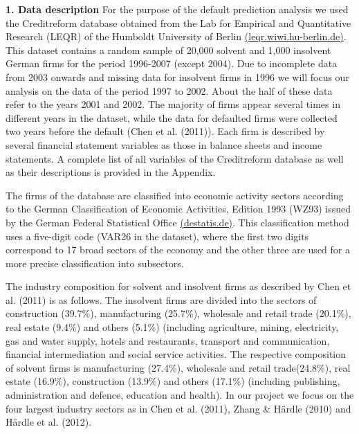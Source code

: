 \documentclass[11pt]{article}
\begin{document}
\textbf{1. Data description}
\vskip 0.2in
For the purpose of the default prediction analysis we used  the Creditreform database obtained from the Lab for Empirical and Quantitative Research (LEQR) of the Humboldt University of Berlin \href{<https://leqr.wiwi.hu-berlin.de/leqr/content/databaseInformation/creditreform/creditreform.htm>}{
(leqr.wiwi.hu-berlin.de)}. This dataset contains a random sample of 20,000 solvent and 1,000 insolvent German firms for the period 1996-2007 (except 2004). 
Due to incomplete data from 2003 onwards and missing data for insolvent firms in 1996 we will focus our analysis on the data of the period 1997 to 2002. About the half of these data refer to the years 2001 and 2002. The majority of firms appear several times in different years in the dataset, while the data for defaulted firms were collected two years before the default (Chen et al. (2011)). Each firm is described by several financial statement variables as those in balance sheets and income statements. A complete list of all variables of the Creditreform database as well as their descriptions is provided in the Appendix. 

The firms of the database are classified into economic activity sectors according to the German Classification of Economic Activities, Edition 1993 (WZ93) issued by the German Federal Statistical Office \href{<https://www.destatis.de/DE/Methoden/Klassifikationen/GueterWirtschaftklassifikationen/Content75/KlassifikationWZ93.html>}{(destatis.de)}. This classification method uses a five-digit code (VAR26 in the dataset), where the first two digits correspond to 17 broad sectors of the economy and the other three are used for a more precise classification into subsectors.

The industry composition for solvent and insolvent firms as described by Chen et al. (2011) is as follows. The insolvent firms are divided into the sectors of construction (39.7\%), manufacturing (25.7\%), wholesale and retail trade (20.1\%), real estate (9.4\%) and others (5.1\%) (including agriculture, mining, electricity, gas and water supply, hotels and restaurants, transport and communication, financial intermediation and social service activities. The respective composition of solvent firms is manufacturing (27.4\%), wholesale and retail trade(24.8\%), real estate (16.9\%), construction (13.9\%) and others (17.1\%) (including publishing, administration and defence, education and health). In our project we focus on the four largest industry sectors as in Chen et al. (2011), Zhang \& H{\"a}rdle (2010) and H{\"a}rdle et al. (2012).
\end{document}

